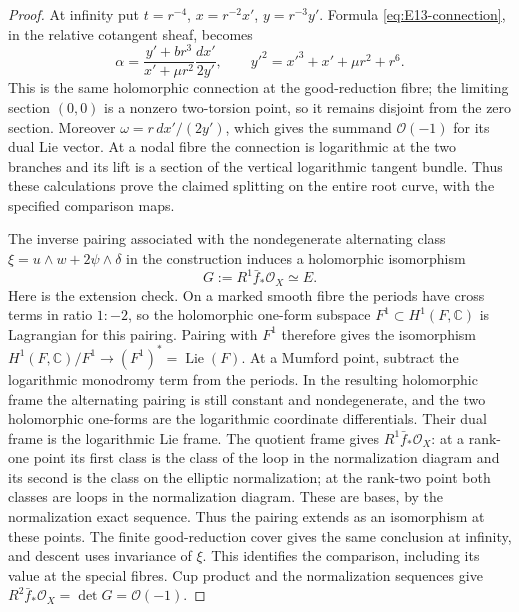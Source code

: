 \begin{proof}
At infinity put $t=r^{-4}$, $x=r^{-2}x'$, $y=r^{-3}y'$. Formula
\eqref{eq:E13-connection}, in the relative cotangent sheaf, becomes
\[
 \alpha=\frac{y'+br^3}{x'+\mu r^2}\frac{dx'}{2y'},
 \qquad y'^2=x'^3+x'+\mu r^2+r^6.
\]
This is the same holomorphic connection at the good-reduction
fibre; the limiting section $(0,0)$ is a nonzero two-torsion point,
so it remains disjoint from the zero section. Moreover
$\omega=r\,dx'/(2y')$, which gives the summand $\mathcal O(-1)$
for its dual Lie vector. At a nodal fibre the connection is
logarithmic at the two branches and its lift is a section of the
vertical logarithmic tangent bundle. Thus these calculations prove
the claimed splitting on the entire root curve, with the specified
comparison maps.

The inverse pairing associated with the nondegenerate alternating
class $\xi=u\wedge w+2\psi\wedge\delta$ in the construction induces a
holomorphic isomorphism
\[
 G:=R^1\bar f_*\mathcal O_X\simeq E.
\]
Here is the extension check. On a marked smooth fibre the periods
have cross terms in ratio $1:-2$, so the holomorphic one-form
subspace $F^1\subset H^1(F,\mathbb C)$ is Lagrangian for this pairing.
Pairing with $F^1$ therefore gives the isomorphism
$H^1(F,\mathbb C)/F^1\to(F^1)^*=\operatorname{Lie}(F)$.
At a Mumford point, subtract the logarithmic monodromy term from the
periods. In the resulting holomorphic frame the alternating pairing
is still constant and nondegenerate, and the two holomorphic
one-forms are the logarithmic coordinate differentials. Their dual
frame is the logarithmic Lie frame. The quotient frame gives
$R^1\bar f_*\mathcal O_X$: at a rank-one point its first class is
the class of the loop in the normalization diagram and its second
is the class on the elliptic normalization; at the rank-two point
both classes are loops in the normalization diagram. These are
bases, by the normalization exact sequence. Thus the pairing extends
as an isomorphism at these points. The finite good-reduction cover
gives the same conclusion at infinity, and descent uses invariance
of $\xi$. This identifies the comparison, including its value at
the special fibres. Cup product and the normalization sequences
give $R^2\bar f_*\mathcal O_X=\det G=\mathcal O(-1)$.


\end{proof}
